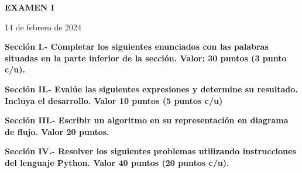 \documentclass[10pt,addpoints]{exam}
\begin{document}
\begin{center}
  \sffamily\textbf{EXAMEN I}
\end{center}
\begin{flushright}
14 de febrero de 2024
\end{flushright}

\begin{questions}
\begin{EnvFullwidth}
  \sffamily\textbf{Sección I.- Completar los siguientes enunciados con las
  palabras situadas en la parte inferior de la sección. Valor: 30 puntos
  (3 punto c/u).}
\end{EnvFullwidth}













\end{questions}

\begin{questions}
\begin{EnvFullwidth}
  \sffamily\textbf{Sección II.- Evalúe las siguientes expresiones y
  determine su resultado. Incluya el desarrollo. Valor 10 puntos (5 puntos
  c/u)}
\end{EnvFullwidth}





\end{questions}

\newpage

\begin{questions}
\begin{EnvFullwidth}
  \sffamily\textbf{Sección III.- Escribir un algoritmo en su
  representación en diagrama de flujo. Valor 20 puntos.}
\end{EnvFullwidth}


%
%

\end{questions}

\begin{questions}
\begin{EnvFullwidth}
  \sffamily\textbf{Sección IV.- Resolver los siguientes problemas utilizando
  instrucciones del lenguaje Python. Valor 40 puntos (20 puntos c/u).}
\end{EnvFullwidth}



%

\end{questions}
\end{document}

